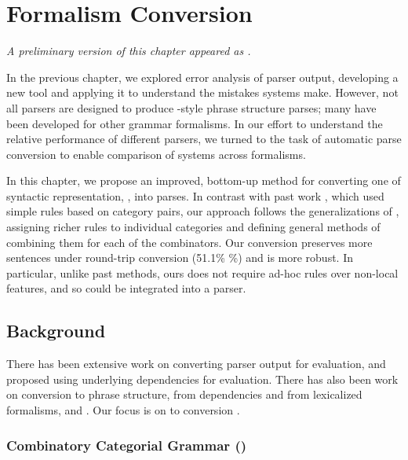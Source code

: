 \chapter{Formalism Conversion} \label{chp:conversion}

\begin{center}
\textit{
  A preliminary version of this chapter appeared as \textcite{Kummerfeld-etal:2012:ACL}.
}
\end{center}

In the previous chapter, we explored error analysis of \ptb parser output, developing a new tool and applying it to understand the mistakes systems make.
However, not all parsers are designed to produce \ptb-style phrase structure parses; many have been developed for other grammar formalisms.
In our effort to understand the relative performance of different parsers, we turned to the task of automatic parse conversion to enable comparison of systems across formalisms.

In this chapter, we propose an improved, bottom-up method for converting one of syntactic representation, \ccg, into \ptb parses.
In contrast with past work \parencite{Clark-Curran:2009}, which used simple rules based on category pairs, our approach follows the generalizations of \ccg, assigning richer rules to individual categories and defining general methods of combining them for each of the \ccg combinators.
Our conversion preserves more sentences under round-trip conversion (51.1\% \%) and is more robust.
In particular, unlike past methods, ours does not require ad-hoc rules over non-local features, and so could be integrated into a parser.

\section{Background}

There has been extensive work on converting parser output for evaluation, \myeg
\textcite{Lin:1998} and \textcite{Briscoe-Carroll-Graham-Copestake:2002} proposed
using underlying dependencies for evaluation.  There has also been work on
conversion to phrase structure, from dependencies \parencite{Xia:2001,Xia:2009} and
from lexicalized formalisms, \myeg \hpsg \parencite{Matsuzaki-Tsujii:2008} and \mytag
\parencite{Chiang:2000,Sarkar:2001}. Our focus is on \ccg to \ptb conversion
\parencite{Clark-Curran:2009}.

\subsection{Combinatory Categorial Grammar (\ccg)}

